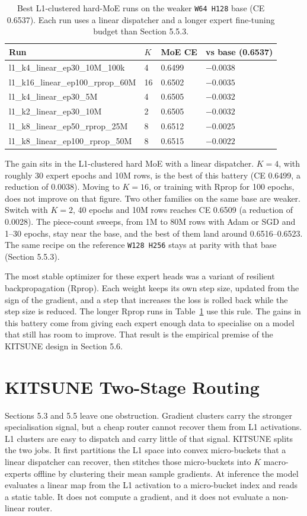 \begin{table}[H]
	\centering
	\small
	\begin{tabular}{llll}
		\toprule
		Run & $K$ & MoE CE & vs base (0.6537) \\
		\midrule
		l1\_k4\_linear\_ep30\_10M\_100k & 4 & 0.6499 & $-0.0038$ \\
		l1\_k16\_linear\_ep100\_rprop\_60M & 16 & 0.6502 & $-0.0035$ \\
		l1\_k4\_linear\_ep30\_5M & 4 & 0.6505 & $-0.0032$ \\
		l1\_k2\_linear\_ep30\_10M & 2 & 0.6505 & $-0.0032$ \\
		l1\_k8\_linear\_ep50\_rprop\_25M & 8 & 0.6512 & $-0.0025$ \\
		l1\_k8\_linear\_ep100\_rprop\_50M & 8 & 0.6515 & $-0.0022$ \\
		\bottomrule
	\end{tabular}
	\caption{Best L1-clustered hard-MoE runs on the weaker \texttt{W64 H128} base (CE 0.6537). Each run uses a linear dispatcher and a longer expert fine-tuning budget than Section 5.5.3.}
	\label{tab:5.15}
\end{table}

The gain sits in the L1-clustered hard MoE with a linear dispatcher. $K=4$, with roughly 30 expert epochs and 10M rows, is the best of this battery (CE 0.6499, a reduction of 0.0038). Moving to $K=16$, or training with Rprop for 100 epochs, does not improve on that figure. Two other families on the same base are weaker. Switch with $K=2$, 40 epochs and 10M rows reaches CE 0.6509 (a reduction of 0.0028). The piece-count sweeps, from 1M to 80M rows with Adam or SGD and 1--30 epochs, stay near the base, and the best of them land around 0.6516--0.6523. The same recipe on the reference \texttt{W128 H256} stays at parity with that base (Section 5.5.3).

The most stable optimizer for these expert heads was a variant of resilient backpropagation (Rprop). Each weight keeps its own step size, updated from the sign of the gradient, and a step that increases the loss is rolled back while the step size is reduced. The longer Rprop runs in Table~\ref{tab:5.15} use this rule. The gains in this battery come from giving each expert enough data to specialise on a model that still has room to improve. That result is the empirical premise of the KITSUNE design in Section 5.6.

\section{KITSUNE Two-Stage Routing}
Sections 5.3 and 5.5 leave one obstruction. Gradient clusters carry the stronger specialisation signal, but a cheap router cannot recover them from L1 activations. L1 clusters are easy to dispatch and carry little of that signal. KITSUNE splits the two jobs. It first partitions the L1 space into convex micro-buckets that a linear dispatcher can recover, then stitches those micro-buckets into $K$ macro-experts offline by clustering their mean sample gradients. At inference the model evaluates a linear map from the L1 activation to a micro-bucket index and reads a static table. It does not compute a gradient, and it does not evaluate a non-linear router.


